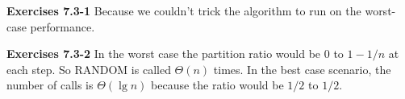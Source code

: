 \documentclass[a4paper,12pt]{article}
\newcommand{\newpar}[1]
{\bigskip \noindent \textbf{Exercises #1} \newline}
\begin{document}
\newpar{7.3-1}
Because we couldn't trick the algorithm to run on the worst-case
performance.

\newpar{7.3-2}
In the worst case the partition ratio would be $0$ to $1-1/n$ at each
step.  So \textsc{RANDOM} is called $\Theta(n)$ times.  In the best
case scenario,  the number of calls is $\Theta(\lg n)$ because the
ratio would be $1/2$ to $1/2$.
\end{document}
